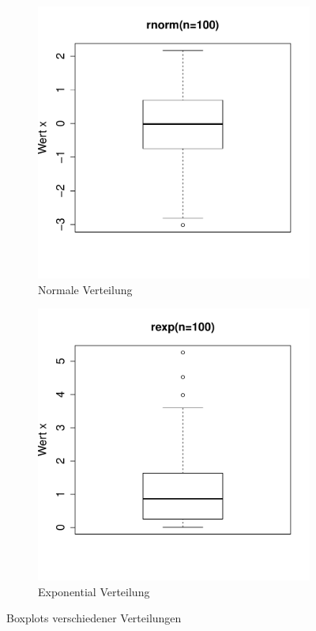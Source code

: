 \begin{figure}[h!]
\begin{subfigure}[b]{0.48\textwidth}
\includegraphics{r-cmd-032}
\caption{Normale Verteilung}
\end{subfigure}
\begin{subfigure}[b]{0.48\textwidth}
\includegraphics{r-cmd-033}
\caption{Exponential Verteilung}
\end{subfigure}
\caption{Boxplots verschiedener Verteilungen}
\end{figure}
